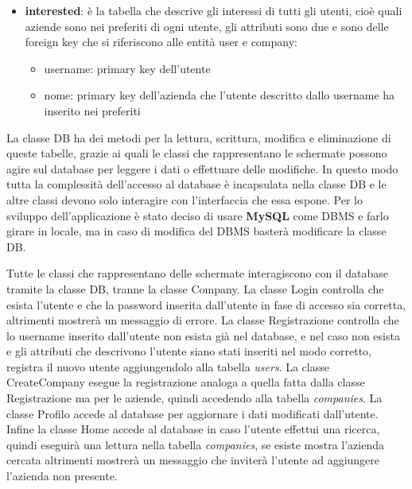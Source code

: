 \begin{itemize}
\begin{itemize}
\end{itemize}
\item \textbf{interested}: è la tabella che descrive gli interessi di tutti gli utenti, cioè quali aziende sono nei preferiti di ogni utente, gli attributi sono due e sono delle foreign key che si riferiscono alle entità user e company:
\begin{itemize}
\item username: primary key dell'utente
\item nome: primary key dell'azienda che l'utente descritto dallo username ha inserito nei preferiti
\end{itemize}
\end{itemize}

La classe DB ha dei metodi per la lettura, scrittura, modifica e eliminazione di queste tabelle, grazie ai quali le classi che rappresentano le schermate possono agire sul database per leggere i dati o effettuare delle modifiche. In questo modo tutta la complessità dell'accesso al database è incapsulata nella classe DB e le altre classi devono solo interagire con l'interfaccia che essa espone. Per lo sviluppo dell'applicazione è stato deciso di usare \textbf{MySQL} come DBMS e farlo girare in locale, ma in caso di modifica del DBMS basterà modificare la classe DB.

Tutte le classi che rappresentano delle schermate interagiscono con il database tramite la classe DB, tranne la classe Company. La classe Login controlla che esista l'utente e che la password inserita dall'utente in fase di accesso sia corretta, altrimenti mostrerà un messaggio di errore. La classe Registrazione controlla che lo username inserito dall'utente non esista già nel database, e nel caso non esista e gli attributi che descrivono l'utente siano stati inseriti nel modo corretto, registra il nuovo utente aggiungendolo alla tabella \textit{users}. La classe CreateCompany esegue la registrazione analoga a quella fatta dalla classe Registrazione ma per le aziende, quindi accedendo alla tabella \textit{companies}. La classe Profilo accede al database per aggiornare i dati modificati dall'utente.  Infine la classe Home accede al database in caso l'utente effettui una ricerca, quindi eseguirà una lettura nella tabella \textit{companies}, se esiste mostra l'azienda cercata altrimenti mostrerà un messaggio che inviterà l'utente ad aggiungere l'azienda non presente.


